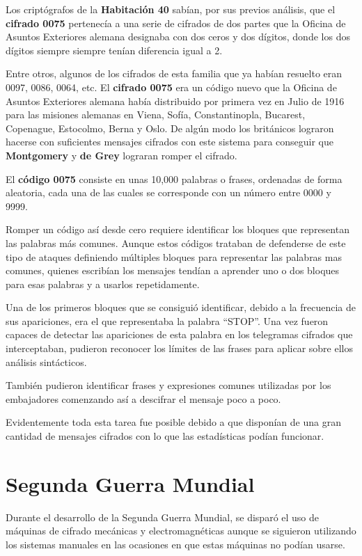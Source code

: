\documentclass[nochap]{apuntesURJC}
\begin{document}
Los criptógrafos de la \textbf{Habitación 40} sabían, por sus previos análisis, que el \textbf{cifrado 0075} pertenecía a una serie de cifrados de dos partes que la Oficina de Asuntos Exteriores alemana designaba con dos ceros y dos dígitos, donde los dos dígitos siempre siempre tenían diferencia igual a 2.

Entre otros, algunos de los cifrados de esta familia que ya habían resuelto eran 0097, 0086, 0064, etc. El \textbf{cifrado 0075} era un código nuevo que la Oficina de Asuntos Exteriores alemana había distribuido por primera vez en Julio de 1916 para las misiones alemanas en Viena, Sofía, Constantinopla, Bucarest, Copenague, Estocolmo, Berna y Oslo. De algún modo los británicos lograron hacerse con suficientes mensajes cifrados con este sistema para conseguir que \textbf{Montgomery} y \textbf{de Grey} lograran romper el cifrado.

El \textbf{código 0075} consiste en unas 10,000 palabras o frases, ordenadas de forma aleatoria, cada una de las cuales se corresponde con un número entre 0000 y 9999.

Romper un código así desde cero requiere identificar los bloques que representan las palabras más comunes. Aunque estos códigos trataban de defenderse de este tipo de ataques definiendo múltiples bloques para representar las palabras mas comunes, quienes escribían los mensajes tendían a aprender uno o dos bloques para esas palabras y a usarlos repetidamente.

Una de los primeros bloques que se consiguió identificar, debido a la frecuencia de sus apariciones, era el que representaba la palabra ``STOP''. Una vez fueron capaces de detectar las apariciones de esta palabra en los telegramas cifrados que interceptaban, pudieron reconocer los límites de las frases para aplicar sobre ellos análisis sintácticos.

También pudieron identificar frases y expresiones comunes utilizadas por los embajadores comenzando así a descifrar el mensaje poco a poco.

Evidentemente toda esta tarea fue posible debido a que disponían de una gran cantidad de mensajes cifrados con lo que las estadísticas podían funcionar.

\section{Segunda Guerra Mundial}
Durante el desarrollo de la Segunda Guerra Mundial, se disparó el uso de máquinas de cifrado mecánicas y electromagnéticas aunque se siguieron utilizando los sistemas manuales en las ocasiones en que estas máquinas no podían usarse.
\end{document}
